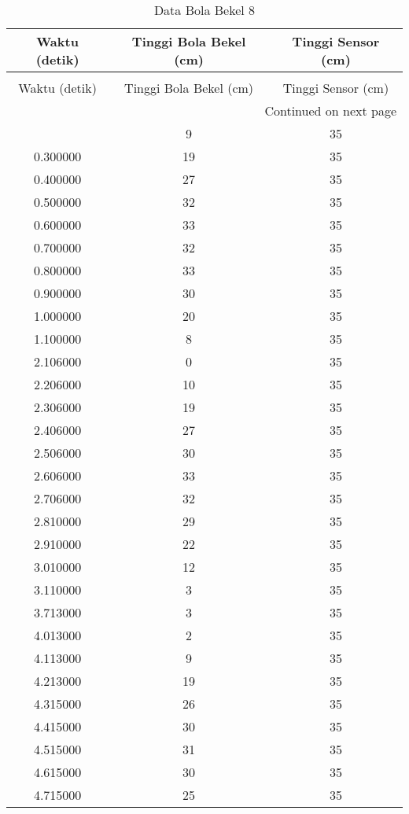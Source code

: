 \begin{longtable}[htbp]{|c|c|c|}
\caption{Data Bola Bekel 8} \\
\hline
Waktu (detik) & Tinggi Bola Bekel (cm) & Tinggi Sensor (cm) \\ \hline
\endfirsthead
\caption[]{Data Bola Bekel 8} \\
\hline
Waktu (detik) & Tinggi Bola Bekel (cm) & Tinggi Sensor (cm) \\ \hline
\endhead
\multicolumn{3}{r}{Continued on next page} \\
\endfoot
\endlastfoot
0.200000 & 9 & 35 \\ \hline
0.300000 & 19 & 35 \\ \hline
0.400000 & 27 & 35 \\ \hline
0.500000 & 32 & 35 \\ \hline
0.600000 & 33 & 35 \\ \hline
0.700000 & 32 & 35 \\ \hline
0.800000 & 33 & 35 \\ \hline
0.900000 & 30 & 35 \\ \hline
1.000000 & 20 & 35 \\ \hline
1.100000 & 8 & 35 \\ \hline
2.106000 & 0 & 35 \\ \hline
2.206000 & 10 & 35 \\ \hline
2.306000 & 19 & 35 \\ \hline
2.406000 & 27 & 35 \\ \hline
2.506000 & 30 & 35 \\ \hline
2.606000 & 33 & 35 \\ \hline
2.706000 & 32 & 35 \\ \hline
2.810000 & 29 & 35 \\ \hline
2.910000 & 22 & 35 \\ \hline
3.010000 & 12 & 35 \\ \hline
3.110000 & 3 & 35 \\ \hline
3.713000 & 3 & 35 \\ \hline
4.013000 & 2 & 35 \\ \hline
4.113000 & 9 & 35 \\ \hline
4.213000 & 19 & 35 \\ \hline
4.315000 & 26 & 35 \\ \hline
4.415000 & 30 & 35 \\ \hline
4.515000 & 31 & 35 \\ \hline
4.615000 & 30 & 35 \\ \hline
4.715000 & 25 & 35 \\ \hline

\end{longtable}
